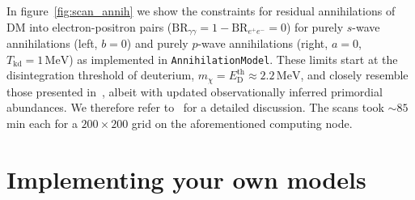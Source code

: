 \documentclass[11pt,a4paper]{article}
\begin{document}
In figure~\ref{fig:scan_annih} we show the constraints for residual annihilations of DM into electron-positron pairs ($\text{BR}_{\gamma \gamma} = 1 - \text{BR}_{e^+ e^-} = 0$) for purely $s$-wave annihilations (left, $b = 0$) and purely $p$-wave annihilations (right, $a = 0$, $T_\mathrm{kd} = 1 \, \mathrm{MeV}$) as implemented in \texttt{AnnihilationModel}. These limits start at the disintegration threshold of deuterium, $m_\chi = E_\mathrm{D}^\mathrm{th} \approx 2.2 \, \mathrm{MeV}$, and closely resemble those presented in~\cite{Depta:2019lbe}, albeit with updated observationally inferred primordial abundances. We therefore refer to~\cite{Depta:2019lbe} for a detailed discussion. The scans took $\sim 85$ min each for a $200 \times 200$ grid on the aforementioned computing node.

\section{Implementing your own models}
\label{sec:implementing_models}
\end{document}
